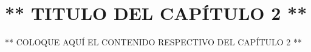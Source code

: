 \chapter{** TITULO DEL CAPÍTULO 2 **}
\thispagestyle{empty}

** COLOQUE AQUÍ EL CONTENIDO RESPECTIVO DEL CAPÍTULO 2 **
